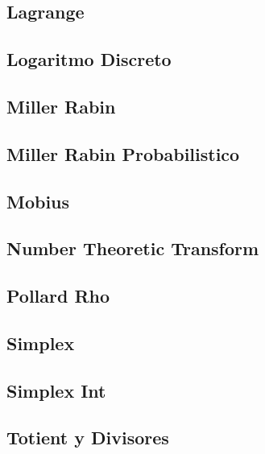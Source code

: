 \subsection{Lagrange}
\raggedbottom
\hrulefill
\subsection{Logaritmo Discreto}
\raggedbottom
\hrulefill
\subsection{Miller Rabin}
\raggedbottom
\hrulefill
\subsection{Miller Rabin Probabilistico}
\raggedbottom
\hrulefill
\subsection{Mobius}
\raggedbottom
\hrulefill
\subsection{Number Theoretic Transform}
\raggedbottom
\hrulefill
\subsection{Pollard	Rho}
\raggedbottom
\hrulefill
\subsection{Simplex}
\raggedbottom
\hrulefill
\subsection{Simplex Int}
\raggedbottom
\hrulefill
\subsection{Totient y Divisores}
\raggedbottom
\hrulefill
